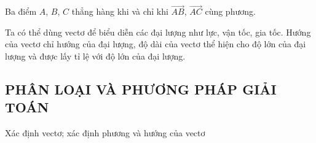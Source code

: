 \begin{khung4}{}
	Ba điểm $A$, $B$, $C$ thẳng hàng khi và chỉ khi $\overrightarrow{AB}$, $\overrightarrow{AC}$ cùng phương.
\end{khung4}
\begin{note}
	Ta có thể dùng vectơ để biểu diễn các đại lượng như lực, vận tốc, gia tốc. Hướng của vectơ chỉ hướng của đại lượng, độ dài của vectơ thể hiện cho độ lớn của đại lượng và được lấy tỉ lệ với độ lớn của đại lượng.
\end{note}
\subsection{PHÂN LOẠI VÀ PHƯƠNG PHÁP GIẢI TOÁN}
\begin{dang}{Xác định vectơ; xác định phương và hướng của vectơ}
\end{dang}
\begin{vd}%
\end{vd}

